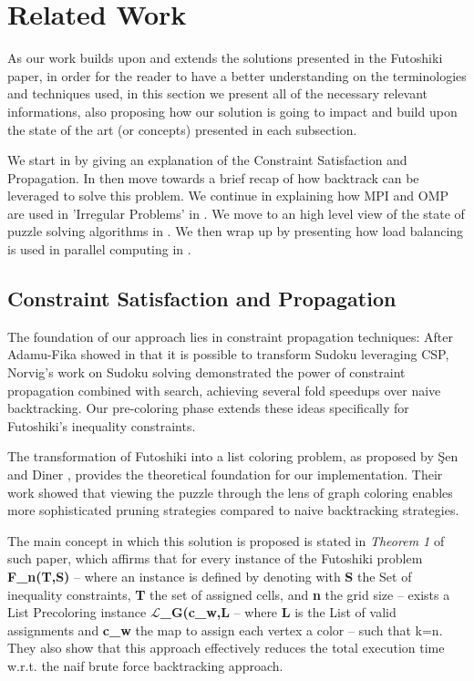 \section{Related Work}
\label{sec:related_work}
As our work builds upon and extends the solutions presented in the Futoshiki paper, in order for the reader to have a better understanding on the terminologies and techniques used, in this section we present all of the necessary relevant informations, also proposing how our solution is going to impact and build upon the state of the art (or concepts) presented in each subsection. 

We start in  by giving an explanation of the Constraint Satisfaction and Propagation. In  then move towards a brief recap of how backtrack can be leveraged to solve this problem. We continue in explaining how MPI and OMP are used in 'Irregular Problems' in . We move to an high level view of the state of puzzle solving algorithms in . We then wrap up by presenting how load balancing is used in parallel computing in .

\subsection{Constraint Satisfaction and Propagation}
\label{subsec:csp}
The foundation of our approach lies in constraint propagation techniques: After Adamu-Fika showed in \cite{sudoku_csp} that it is possible to transform Sudoku leveraging CSP, Norvig's work on Sudoku solving \cite{NorvigSudoku} demonstrated the power of constraint propagation combined with search, achieving several fold speedups over naive backtracking. Our pre-coloring phase extends these ideas specifically for Futoshiki's inequality constraints.

The transformation of Futoshiki into a list coloring problem, as proposed by Şen and Diner \cite{Sen2024Futoshiki}, provides the theoretical foundation for our implementation. Their work showed that viewing the puzzle through the lens of graph coloring enables more sophisticated pruning strategies compared to naive backtracking strategies. 

The main concept in which this solution is proposed is stated in \textit{Theorem 1} of such paper, which affirms that for every instance of the Futoshiki problem \textbf{F\_n(T,S)} -- where an instance is defined by denoting with \textbf{S} the Set of inequality constraints, \textbf{T} the set of assigned cells, and \textbf{n} the grid size -- exists a List Precoloring instance \textbf{$\mathcal{L}$\_G(c\_w,L} -- where \textbf{L} is the List of valid assignments and \textbf{c\_w} the map to assign each vertex a color -- such that k=n. They also show that this approach effectively reduces the total execution time w.r.t. the naif brute force backtracking approach.

